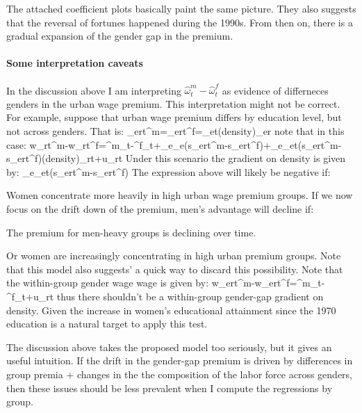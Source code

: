 The attached coefficient plots basically paint the same picture. They also suggests that the reversal of fortunes happened during the 1990s. From then on, there is a gradual expansion of the gender gap in the premium.





\paragraph{Some interpretation caveats}
\bitem
	\item In the discussion above I am interpreting  $\hat{\omega}^m_t-\hat{\omega}^f_t$ as evidence of differneces genders in the urban wage premium. This interpretation might not be correct. For example, suppose that urban wage premium differs by education level, but not across genders. That is:
	\beqns
		\gamma_{ert}^m=\gamma_{ert}^f=\omega_{et}\ln(density)_{er}
	\eeqns
	note that in this case:
	\beqns
		w_{rt}^m-w_{rt}^f=\alpha^m_t-\alpha^f_t+\sum_e\delta_e(s_{ert}^m-s_{ert}^f)+\sum_{e}\omega_{et}(s_{ert}^m-s_{ert}^f)\ln(density)_{rt}+u_{rt}
	\eeqns
	Under this scenario the gradient on density is given by:
	\beqns
		\sum_{e}\omega_{et}(s_{ert}^m-s_{ert}^f)
	\eeqns
	The expression above will likely be negative if:
	\bitem 
		\item Women concentrate more heavily in high urban wage premium groups.
	\eitem 
	If we now focus on the drift down of the premium, men's advantage will decline if:
	\bitem
		\item The premium for men-heavy groups is declining over time.
		\item Or women are increasingly concentrating in high urban premium groups.
	\eitem
	Note that this model also suggests' a quick way to discard this possibility. Note that the within-group gender wage wage is given by:
	\beqns
			w_{ert}^m-w_{ert}^f=\alpha^m_t-\alpha^f_t+u_{rt}
	\eeqns
	thus there shouldn't be a within-group gender-gap gradient on density. Given the increase in women's educational attainment since the 1970 education is a natural target to apply this test.
	
	The discussion above takes the proposed model too seriously, but it gives an useful intuition. If the drift in the gender-gap premium is driven by differences in group premia + changes in the the composition of the labor force across genders, then these issues should be less prevalent when I compute the regressions by group.
\eitem 

